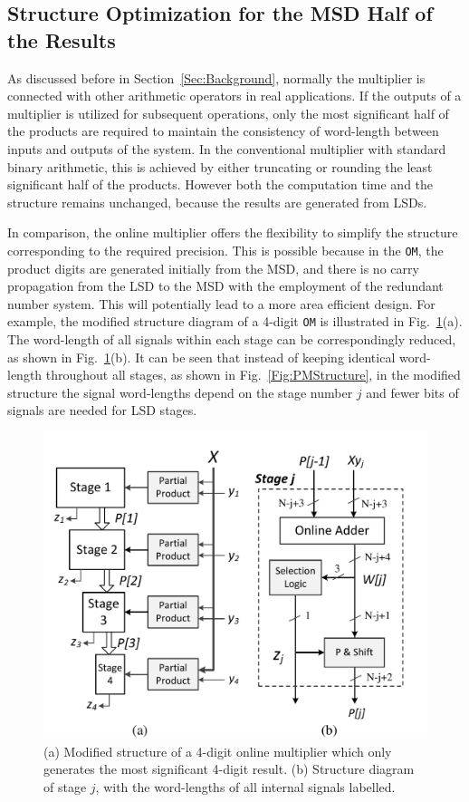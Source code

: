 \documentclass[conference]{IEEEtran}
\begin{document}
\subsection{Structure Optimization for the MSD Half of the Results}
As discussed before in Section~\ref{Sec:Background}, normally the multiplier is connected with other arithmetic operators in real applications. If the outputs of a multiplier is utilized for subsequent operations, only the most significant half of the products are required to maintain the consistency of word-length between inputs and outputs of the system. In the conventional multiplier with standard binary arithmetic, this is achieved by either truncating or rounding the least significant half of the products. However both the computation time and the structure remains unchanged, because the results are generated from LSDs.

In comparison, the online multiplier offers the flexibility to simplify the structure corresponding to the required precision. This is possible because in the \texttt{OM}, the product digits are generated initially from the MSD, and there is no carry propagation from the LSD to the MSD with the employment of the redundant number system. This will potentially lead to a more area efficient design. For example, the modified structure diagram of a 4-digit \texttt{OM} is illustrated in Fig.~\ref{Fig:PMStructure_MSDhalf}(a). The word-length of all signals within each stage can be correspondingly reduced, as shown in Fig.~\ref{Fig:PMStructure_MSDhalf}(b). It can be seen that instead of keeping identical word-length throughout all stages, as shown in Fig.~\ref{Fig:PMStructure}, in the modified structure the signal word-lengths depend on the stage number $j$ and fewer bits of signals are needed for LSD stages.

\begin{figure}[tbp]
	\centering
	\includegraphics[width=.5\textwidth]{./Figures/ParallelMult_MSDhalf.pdf}
	\caption{(a) Modified structure of a 4-digit online multiplier which only generates the most significant 4-digit result. (b) Structure diagram of stage $j$, with the word-lengths of all internal signals labelled.}
	\label{Fig:PMStructure_MSDhalf}
	\vspace{-2ex}
\end{figure}
\end{document}
